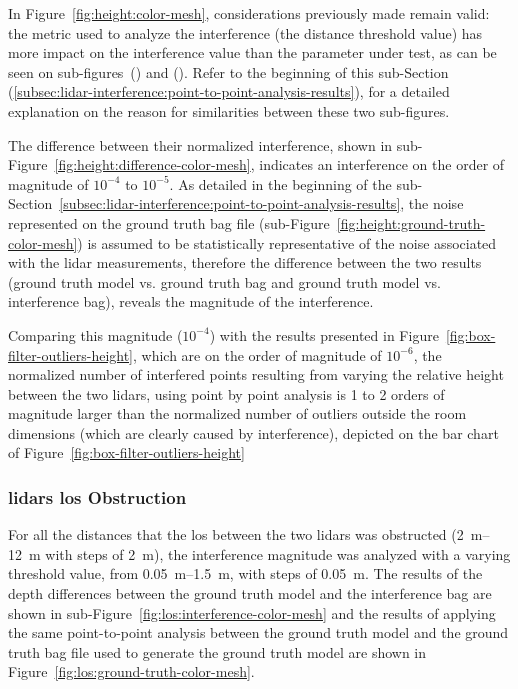 In Figure~\ref{fig:height:color-mesh}, considerations previously made remain valid: the metric used to analyze the interference (the distance threshold value) has more impact on the interference value than the parameter under test, as can be seen on sub-figures~() and (). Refer to the beginning of this sub-Section (\ref{subsec:lidar-interference:point-to-point-analysis-results}), for a detailed explanation on the reason for similarities between these two sub-figures. 

The difference between their normalized interference, shown in sub-Figure~\ref{fig:height:difference-color-mesh}, indicates an interference on the order of magnitude of $10^{-4}$ to $10^{-5}$. As detailed in the beginning of the sub-Section~\ref{subsec:lidar-interference:point-to-point-analysis-results}, the noise represented on the ground truth bag file (sub-Figure~\ref{fig:height:ground-truth-color-mesh}) is assumed to be statistically representative of the noise associated with the \ac{lidar} measurements, therefore the difference between the two results (ground truth model vs. ground truth bag and ground truth model vs. interference bag), reveals the magnitude of the interference. 

Comparing this magnitude ($10^{-4}$) with the results presented in Figure~\ref{fig:box-filter-outliers-height}, which are on the order of magnitude of $10^{-6}$, the normalized number of interfered points resulting from varying the relative height between the two \acp{lidar}, using point by point analysis is 1 to 2 orders of magnitude larger than the normalized number of outliers outside the room dimensions (which are clearly caused by interference), depicted on the bar chart of Figure~\ref{fig:box-filter-outliers-height}

\subsubsection{\acsp{lidar} \acl{los} Obstruction}
For all the distances that the \acf{los} between the two \acp{lidar} was obstructed (\SIrange{2}{12}{\meter} with steps of \SI{2}{\meter}), the interference magnitude was analyzed with a varying threshold value, from \SIrange{0.05}{1.5}{\meter}, with steps of \SI{0.05}{\meter}. The results of the depth differences between the ground truth model and the interference bag are shown in sub-Figure~\ref{fig:los:interference-color-mesh} and the results of applying the same point-to-point analysis between the ground truth model and the ground truth bag file used to generate the ground truth model are shown in Figure~\ref{fig:los:ground-truth-color-mesh}.

